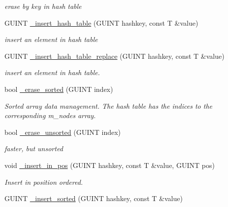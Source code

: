 \begin{CompactItemize}
\begin{CompactList}\small\item\em erase by key in hash table \item\end{CompactList}\item 
GUINT \hyperlink{classgim__hash__table_4339a279d721d1e687b8d8063332bac8}{\_\-insert\_\-hash\_\-table} (GUINT hashkey, const T \&value)
\begin{CompactList}\small\item\em insert an element in hash table \item\end{CompactList}\item 
GUINT \hyperlink{classgim__hash__table_6ebfb7415bd946855ec5730651f7c191}{\_\-insert\_\-hash\_\-table\_\-replace} (GUINT hashkey, const T \&value)
\begin{CompactList}\small\item\em insert an element in hash table. \item\end{CompactList}\item 
\hypertarget{classgim__hash__table_e347a062b1b5907b81127e6bacbbb10e}{
bool \hyperlink{classgim__hash__table_e347a062b1b5907b81127e6bacbbb10e}{\_\-erase\_\-sorted} (GUINT index)}
\label{classgim__hash__table_e347a062b1b5907b81127e6bacbbb10e}

\begin{CompactList}\small\item\em Sorted array data management. The hash table has the indices to the corresponding m\_\-nodes array. \item\end{CompactList}\item 
\hypertarget{classgim__hash__table_0b68afa191499a10ac7d7c34230a7d89}{
bool \hyperlink{classgim__hash__table_0b68afa191499a10ac7d7c34230a7d89}{\_\-erase\_\-unsorted} (GUINT index)}
\label{classgim__hash__table_0b68afa191499a10ac7d7c34230a7d89}

\begin{CompactList}\small\item\em faster, but unsorted \item\end{CompactList}\item 
void \hyperlink{classgim__hash__table_3eacaf88e1b18815c0b89d368d77a93a}{\_\-insert\_\-in\_\-pos} (GUINT hashkey, const T \&value, GUINT pos)
\begin{CompactList}\small\item\em Insert in position ordered. \item\end{CompactList}\item 
\hypertarget{classgim__hash__table_66d18cb60b0628a9aa759304395f4825}{
GUINT \hyperlink{classgim__hash__table_66d18cb60b0628a9aa759304395f4825}{\_\-insert\_\-sorted} (GUINT hashkey, const T \&value)}
\label{classgim__hash__table_66d18cb60b0628a9aa759304395f4825}


\end{CompactItemize}
